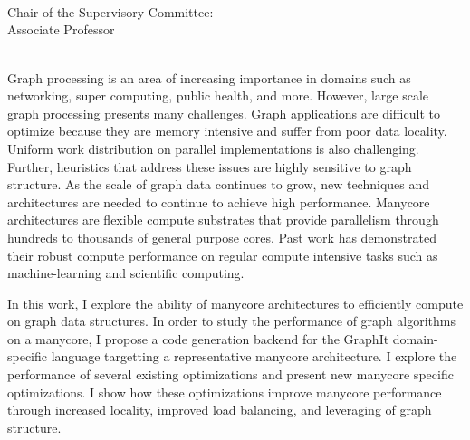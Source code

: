 \begingroup
\let\clearpage\relax
\let\cleardoublepage\relax
\let\cleardoublepage\relax

\thispagestyle{empty}
\begin{center}
     \\
    \bigskip
    {\color{CTtitle}\spacedallcaps{\myTitle} \\ \bigskip
    }
    \bigskip
    \myName \\
    \bigskip
    Chair of the Supervisory Committee: \\
    Associate Professor \myChair \\
    \myDepartment \\
    \bigskip
\end{center}




\endgroup

\vfill
Graph processing is an area of increasing importance in domains such as networking, super computing, public health, and more.
However, large scale graph processing presents many challenges.
Graph applications are difficult to optimize because they are memory intensive and suffer from poor data locality.
Uniform work distribution on parallel implementations is also challenging.
Further, heuristics that address these issues are highly sensitive to graph structure.
As the scale of graph data continues to grow, new techniques and architectures are needed to continue to achieve high performance.
Manycore architectures are flexible compute substrates that provide parallelism through hundreds to thousands of general purpose cores.
Past work has demonstrated their robust compute performance on regular compute intensive tasks such as machine-learning and scientific computing.

In this work, I explore the ability of manycore architectures to efficiently compute on graph data structures.
In order to study the performance of graph algorithms on a manycore, I propose a code generation backend for the GraphIt domain-specific language targetting a representative manycore architecture.
I explore the performance of several existing optimizations and present new manycore specific optimizations.
I show how these optimizations improve manycore performance through increased locality, improved load balancing, and leveraging of graph structure.
